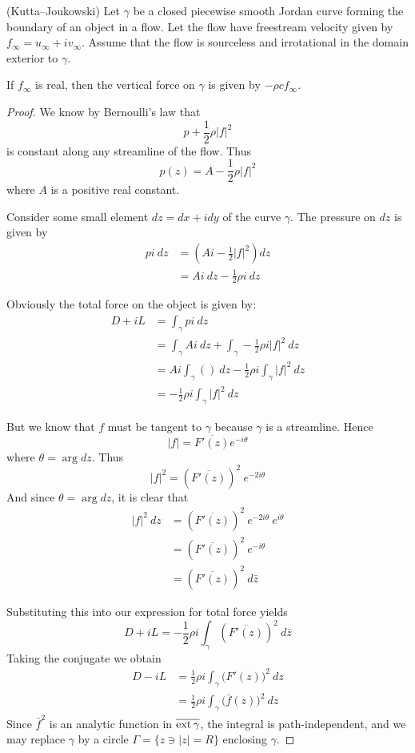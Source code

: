 \documentclass[letterpaper, twoside, 12 pt]{article}
\begin{document}
	\begin{theorem}(Kutta--Joukowski)
		Let $\gamma$ be a closed piecewise smooth Jordan curve forming the boundary of an object in a flow.
		Let the flow have freestream velocity given by $f_\infty = u_\infty + i v_\infty$.
		Assume that the flow is sourceless and irrotational in the domain exterior to $\gamma$.

		If $f_\infty$ is real, then the vertical force on $\gamma$ is given by $-\rho c f_\infty$.
	\end{theorem}
	\begin{proof}
		We know by Bernoulli's law that 
		\[
			p + \frac{1}{2} \rho |f|^2
		\]
		is constant along any streamline of the flow.
		Thus
		\[
			p(z) = A - \frac{1}{2} \rho |f|^2
		\]
		where $A$ is a positive real constant.

		Consider some small element $dz = dx + i dy$ of the curve $\gamma$.
		The pressure on $dz$ is given by 
		\begin{align*}
			p i \> dz &= \left(  A i - \frac{1}{2} |f|^2 \right) dz \\
			&= Ai \> dz - \frac{1}{2} \rho i \> dz
		\end{align*}
		
		Obviously the total force on the object is given by:
		\begin{align*}
			D + iL &= \int_\gamma p i \ dz  \\
			&= \int_\gamma Ai \ dz + \int_\gamma -\frac{1}{2} \rho i |f|^2 \ dz \\
			&= Ai \int_\gamma () \ dz - \frac{1}{2} \rho i \int_\gamma |f|^2 \ dz \\
			&= - \frac{1}{2} \rho i \int_\gamma |f|^2 \ dz
		\end{align*}

		But we know that $f$ must be tangent to $\gamma$ because $\gamma$ is a streamline.
		Hence
		\[
			|f| = \overline{F'(z)} e^{-i \theta}
		\]
		where $\theta = \arg dz$.
		Thus
		\[
			|f|^2 = \left( \overline{F'(z)} \right)^2 \> e^{-2i \theta}
		\]
		And since $\theta = \arg dz$, it is clear that 
		\begin{align*}
			|f|^2 \ dz &= \left( \overline{F'(z)} \right)^2 \> e^{-2i \theta} \> e^{i \theta} \\
			&= \left( \overline{F'(z)} \right)^2 \> e^{-i \theta} \\
			&= \left( \overline{F'(z)} \right)^2 \ d \bar z
		\end{align*}
		
		
		Substituting this into our expression for total force yields
		\[
			D + iL = - \frac{1}{2} \rho i \int_\gamma \left( \overline{F'(z)} \right)^2 \ d \bar z  
		\]
		Taking the conjugate we obtain
		\begin{align*}
			D - iL &= \frac{1}{2} \rho i \int_\gamma \big( F'(z) \big)^2 \ dz \\
			&= \frac{1}{2} \rho i \int_\gamma \big( \bar f(z) \big)^2 \ dz  
		\end{align*}
		Since $\bar f^2$ is an analytic function in $\overline{\operatorname*{ext} \gamma}$, the integral is path-independent, and we may replace $\gamma$ by a circle $\Gamma = \{ z \ni |z| = R \}$ enclosing $\gamma$.


\end{proof}
\end{document}
